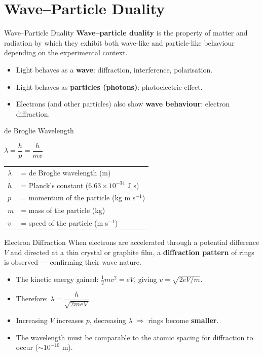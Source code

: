 \section{Wave--Particle Duality}

\begin{definitionbox}{Wave--Particle Duality}
\textbf{Wave--particle duality} is the property of matter and radiation by which they exhibit both wave-like and particle-like behaviour depending on the experimental context.
\begin{itemize}[itemsep=2pt]
  \item Light behaves as a \textbf{wave}: diffraction, interference, polarisation.
  \item Light behaves as \textbf{particles (photons)}: photoelectric effect.
  \item Electrons (and other particles) also show \textbf{wave behaviour}: electron diffraction.
\end{itemize}
\end{definitionbox}

\begin{formulabox}{de Broglie Wavelength}
\begin{center}
\Large $\lambda = \dfrac{h}{p} = \dfrac{h}{mv}$
\end{center}
\vspace{0.3em}
\begin{tabular}{@{}ll@{}}
$\lambda$ & = de Broglie wavelength (m) \\
$h$ & = Planck's constant ($6.63 \times 10^{-34}$ J s) \\
$p$ & = momentum of the particle (kg m s$^{-1}$) \\
$m$ & = mass of the particle (kg) \\
$v$ & = speed of the particle (m s$^{-1}$) \\
\end{tabular}
\end{formulabox}

\begin{keybox}{Electron Diffraction}
When electrons are accelerated through a potential difference $V$ and directed at a thin crystal or graphite film, a \textbf{diffraction pattern} of rings is observed — confirming their wave nature.
\begin{itemize}[itemsep=2pt]
  \item The kinetic energy gained: $\tfrac{1}{2}mv^2 = eV$, giving $v = \sqrt{2eV/m}$.
  \item Therefore: $\lambda = \dfrac{h}{\sqrt{2meV}}$
  \item Increasing $V$ increases $p$, decreasing $\lambda$ $\Rightarrow$ rings become \textbf{smaller}.
  \item The wavelength must be comparable to the atomic spacing for diffraction to occur ($\sim 10^{-10}$ m).
\end{itemize}
\end{keybox}

